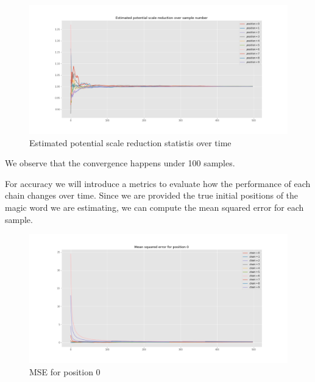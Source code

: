 \documentclass[]{article}
\begin{document}
\begin{figure}[H]
	\begin{center}
		
		\includegraphics[width=1\textwidth]{task4/figures/T_2_4/Q2/convergence_epsr.png}
		\caption*{Estimated potential scale reduction statistis over time}
	\end{center}
\end{figure}

We observe that the convergence happens under 100 samples.

For accuracy we will introduce a metrics to evaluate how the performance of each chain changes over time. Since we are provided the true initial positions of the magic word we are estimating, we can compute the mean squared error for each sample.

\begin{figure}[H]
	\begin{center}
		
		\includegraphics[width=1\textwidth]{task4/figures/T_2_4/Q2/mse_pos0.png}
		\caption*{MSE for position 0}
	\end{center}
\end{figure}
\end{document}
